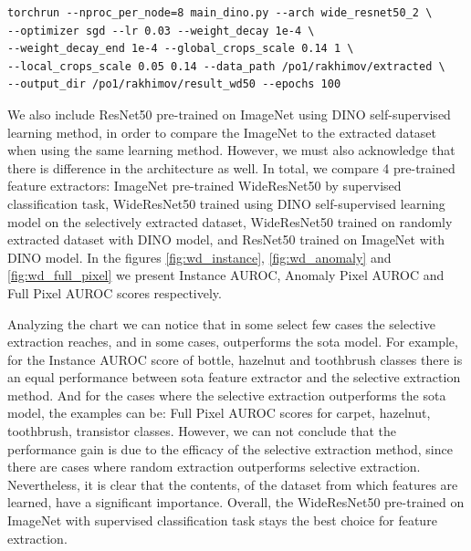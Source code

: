 \begin{lstlisting}
torchrun --nproc_per_node=8 main_dino.py --arch wide_resnet50_2 \ 
--optimizer sgd --lr 0.03 --weight_decay 1e-4 \ 
--weight_decay_end 1e-4 --global_crops_scale 0.14 1 \ 
--local_crops_scale 0.05 0.14 --data_path /po1/rakhimov/extracted \ 
--output_dir /po1/rakhimov/result_wd50 --epochs 100
\end{lstlisting}

We also include ResNet50 pre-trained on ImageNet using DINO self-supervised learning method, in order to compare the ImageNet to the extracted dataset when using the same learning method. However, we must also acknowledge that there is difference in the architecture as well. In total, we compare 4 pre-trained feature extractors: ImageNet pre-trained WideResNet50 by supervised classification task, WideResNet50 trained using DINO self-supervised learning model on the selectively extracted dataset, WideResNet50 trained on randomly extracted dataset with DINO model, and ResNet50 trained on ImageNet with DINO model. In the figures \ref{fig:wd_instance}, \ref{fig:wd_anomaly} and \ref{fig:wd_full_pixel} we present Instance AUROC, Anomaly Pixel AUROC and Full Pixel AUROC scores respectively.

Analyzing the chart we can notice that in some select few cases the selective extraction reaches, and in some cases, outperforms the sota model. For example, for the Instance AUROC score of bottle, hazelnut and toothbrush classes there is an equal performance between sota feature extractor and the selective extraction method. And for the cases where the selective extraction outperforms the sota model, the examples can be: Full Pixel AUROC scores for carpet, hazelnut, toothbrush, transistor classes. However, we can not conclude that the performance gain is due to the efficacy of the selective extraction method, since there are cases where random extraction outperforms selective extraction. Nevertheless, it is clear that the contents, of the dataset from which features are learned, have a significant importance. Overall, the WideResNet50 pre-trained on ImageNet with supervised classification task stays the best choice for feature extraction.


